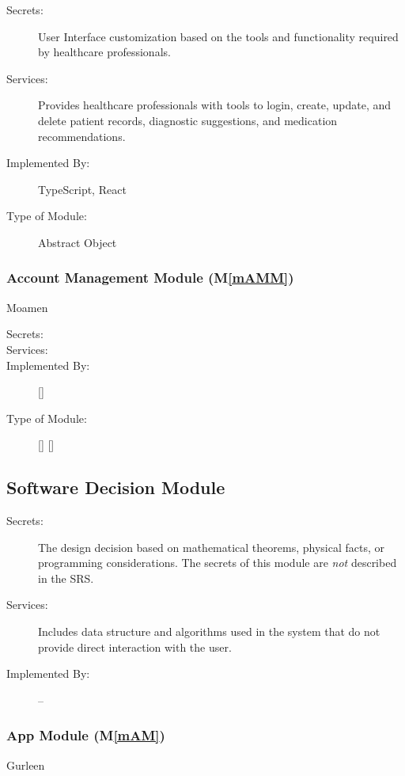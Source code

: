 \documentclass[12pt, titlepage]{article}
\newcommand{\mref}[1]{M\ref{#1}}
\begin{document}
\begin{description}
\item[Secrets:]User Interface customization based on the tools and functionality required by healthcare professionals.
\item[Services:]Provides healthcare professionals with tools to login, create, update, and delete patient records, diagnostic suggestions, and medication recommendations.
\item[Implemented By:]TypeScript, React
\item[Type of Module:]Abstract Object
\end{description}

\subsubsection{Account Management Module (\mref{mAMM})} Moamen

\begin{description}
\item[Secrets:]
\item[Services:]
\item[Implemented By:] []
\item[Type of Module:] []
  []
\end{description}


\subsection{Software Decision Module}

\begin{description}
\item[Secrets:] The design decision based on mathematical theorems, physical facts, or programming considerations. The secrets of this module are
  \emph{not} described in the SRS.
\item[Services:] Includes data structure and algorithms used in the system that do not provide direct interaction with the user. 
\item[Implemented By:] --
\end{description}


\subsubsection{App Module (\mref{mAM})} Gurleen
\end{document}
